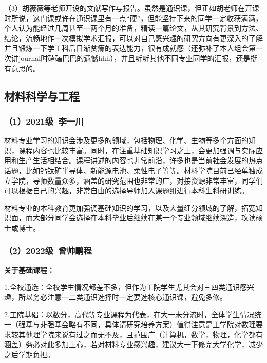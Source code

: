 \documentclass[11pt,oneside]{book}
\begin{document}
\vspace{10pt}

（3）胡薇薇等老师开设的文献写作与报告。虽然是通识课，但正如胡老师在开课时所说，这门课或许在通识课里有一点“硬”，但能坚持下来的同学一定收获满满，个人认为能经过几周甚至一两个月的准备，精读一篇论文，从其研究背景到方法、结论，流畅地作一次模拟学术汇报，可以对自己感兴趣的研究方向有更深入的了解并且锻炼一下学工科后日渐贫瘠的表达能力，很有成就感（还弥补了本人组会第一次讲journal时磕磕巴巴的遗憾hhh），并且听听其他不同专业同学的汇报，还是挺有意思的。  

\subsection{材料科学与工程}
\subsubsection{（1）2021级\ 李一川}
材料专业学习的知识会涉及更多的领域，包括物理、化学、生物等多个方面的知识，课程内容也比较丰富。同时，在注重基础知识学习之上，会更加强调与实际应用和生产生活相结合。课程讲述的内容也非常前沿，许多也是当前社会发展的热点话题，比如钙钛矿半导体、新能源电池、柔性电子等等。材料学院目前已经单独成立学院，导师数量众多，涵盖的研究范围也非常的广，对接资源非常丰富，同学们可以根据自己的兴趣，非常自由的选择导师加入课题组进行本科生科研训练。

\vspace{10pt}

材料专业的本科教育更加强调基础知识的学习，以及大量细分领域的了解，拓宽知识面，而大部分同学会选择在本科毕业后继续在某一个专业领域继续深造，攻读硕士或博士。

\subsubsection{（2）2022级\ 曾帅鹏程}
\textbf{关于基础课程：}

1.全校通选：全校学生情况都差不多，但作为工院学生尤其会对三四类通识感兴趣，所以务必注意一二类通识选择时一定要选核心通识课，避免多修。

\vspace{10pt}

2.工院基础：以数分，高代等专业课程为代表，在大一未分流时，全体学生情况统一（强基与非强基会略有不同，具体请研究培养方案）值得注意是工学院对数理要求较其他理学院来说有过之而无不及，且范围广（计算机，数学，物理，化学都有涵盖）务必对此多加上心，若对材料专业感兴趣，建议大一下修完大学化学，减少之后学期负担。

\vspace{10pt}
\end{document}
